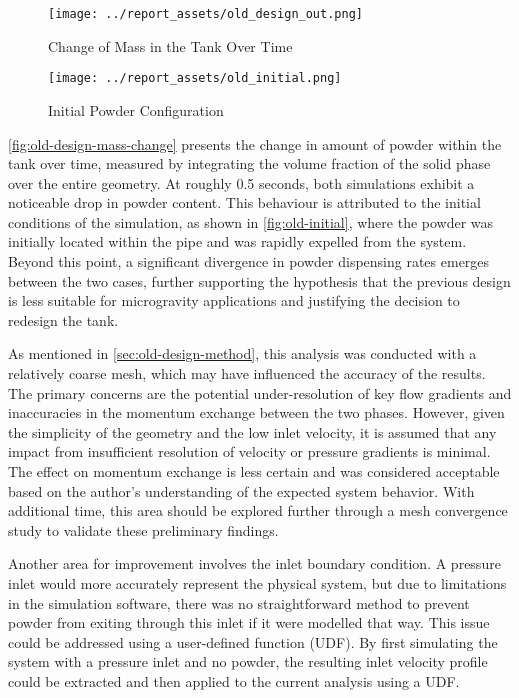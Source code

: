 \begin{figure}[htbp]
    \centering
    
    \begin{minipage}{0.54\textwidth}
        \centering
        \texttt{[image: ../report\_assets/old\_design\_out.png]}
        \caption{Change of Mass in the Tank Over Time}\label{fig:old-design-mass-change}
    \end{minipage}
    \hfill
    \begin{minipage}{0.4\textwidth}
        \centering
        \texttt{[image: ../report\_assets/old\_initial.png]}
        \caption{Initial Powder Configuration}\label{fig:old-initial}
    \end{minipage}
\end{figure}
\autoref{fig:old-design-mass-change} presents the change in amount of powder within the tank over time, measured by integrating the volume fraction of the solid phase over the entire geometry. At roughly 0.5 seconds, both simulations exhibit a noticeable drop in powder content. This behaviour is attributed to the initial conditions of the simulation, as shown in \autoref{fig:old-initial}, where the powder was initially located within the pipe and was rapidly expelled from the system. Beyond this point, a significant divergence in powder dispensing rates emerges between the two cases, further supporting the hypothesis that the previous design is less suitable for microgravity applications and justifying the decision to redesign the tank. 

As mentioned in \autoref{sec:old-design-method}, this analysis was conducted with a relatively coarse mesh, which may have influenced the accuracy of the results. The primary concerns are the potential under-resolution of key flow gradients and inaccuracies in the momentum exchange between the two phases. However, given the simplicity of the geometry and the low inlet velocity, it is assumed that any impact from insufficient resolution of velocity or pressure gradients is minimal. The effect on momentum exchange is less certain and was considered acceptable based on the author's understanding of the expected system behavior. With additional time, this area should be explored further through a mesh convergence study to validate these preliminary findings.

Another area for improvement involves the inlet boundary condition. A pressure inlet would more accurately represent the physical system, but due to limitations in the simulation software, there was no straightforward method to prevent powder from exiting through this inlet if it were modelled that way. This issue could be addressed using a user-defined function (UDF). By first simulating the system with a pressure inlet and no powder, the resulting inlet velocity profile could be extracted and then applied to the current analysis using a UDF.\@

